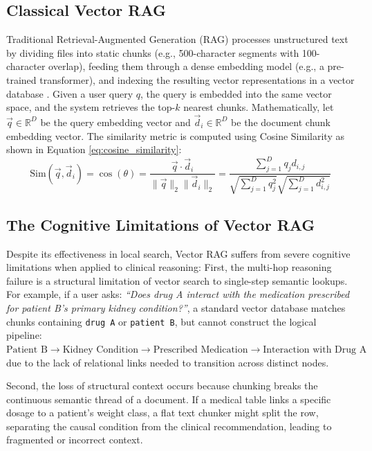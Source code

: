 \documentclass[../main.tex]{subfiles}
\begin{document}
\subsection{Classical Vector RAG}

Traditional Retrieval-Augmented Generation (RAG) processes unstructured text by dividing files into static chunks (e.g., 500-character segments with 100-character overlap), feeding them through a dense embedding model (e.g., a pre-trained transformer), and indexing the resulting vector representations in a vector database \cite{lewis2020retrieval}. Given a user query $q$, the query is embedded into the same vector space, and the system retrieves the top-$k$ nearest chunks. Mathematically, let $\vec{q} \in \mathbb{R}^D$ be the query embedding vector and $\vec{d}_i \in \mathbb{R}^D$ be the document chunk embedding vector. The similarity metric is computed using Cosine Similarity as shown in Equation \eqref{eq:cosine_similarity}:
\begin{equation}\label{eq:cosine_similarity}
\text{Sim}(\vec{q}, \vec{d}_i) = \cos(\theta) = \frac{\vec{q} \cdot \vec{d}_i}{\|\vec{q}\|_2 \|\vec{d}_i\|_2} = \frac{\sum_{j=1}^D q_j d_{i,j}}{\sqrt{\sum_{j=1}^D q_j^2} \sqrt{\sum_{j=1}^D d_{i,j}^2}}
\end{equation}

\subsection{The Cognitive Limitations of Vector RAG}

Despite its effectiveness in local search, Vector RAG suffers from severe cognitive limitations when applied to clinical reasoning:
First, the multi-hop reasoning failure is a structural limitation of vector search to single-step semantic lookups. For example, if a user asks: \textit{``Does drug A interact with the medication prescribed for patient B's primary kidney condition?''}, a standard vector database matches chunks containing \texttt{drug A} or \texttt{patient B}, but cannot construct the logical pipeline: $\text{Patient B} \rightarrow \text{Kidney Condition} \rightarrow \text{Prescribed Medication} \rightarrow \text{Interaction with Drug A}$ due to the lack of relational links needed to transition across distinct nodes.

Second, the loss of structural context occurs because chunking breaks the continuous semantic thread of a document. If a medical table links a specific dosage to a patient's weight class, a flat text chunker might split the row, separating the causal condition from the clinical recommendation, leading to fragmented or incorrect context.
\end{document}
